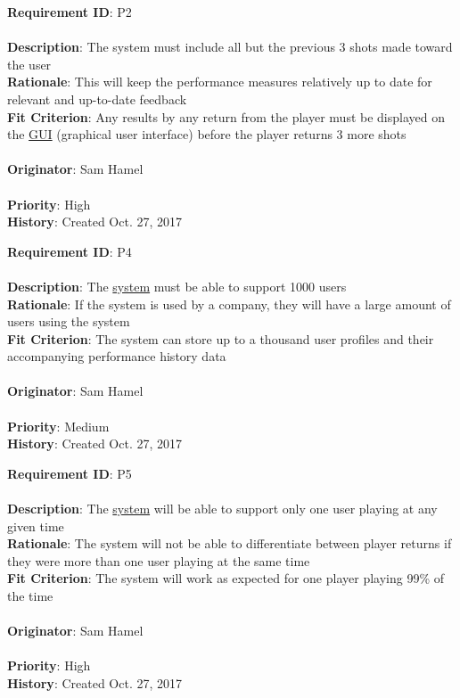 \documentclass[11pt]{article}
\begin{document}
\begin{framed}
	\noindent\textbf{Requirement ID}: P2 \hfill\\\\
	\noindent\textbf{Description}: The system must include all but the previous 3 shots made toward the user  \\
	\textbf{Rationale}: This will keep the performance measures relatively up to date for relevant and up-to-date feedback \\
	\textbf{Fit Criterion}: Any results by any return from the player must be displayed on the \hyperref[sec:definitions]{GUI} (graphical user interface) before the player returns 3 more shots \\\\
	\textbf{Originator}: Sam Hamel \\\\
	\textbf{Priority}: High \hfill \\
	\noindent\textbf{History}: Created Oct. 27, 2017
\end{framed}

\begin{framed}
	\noindent\textbf{Requirement ID}: P4 \hfill\\\\
	\noindent\textbf{Description}: The \hyperref[sec:definitions]{system} must be able to support 1000 users \\
	\textbf{Rationale}: If the system is used by a company, they will have a large amount of users using the system\\
	\textbf{Fit Criterion}: The system can store up to a thousand user profiles and their accompanying performance history data \\\\
	\textbf{Originator}: Sam Hamel \\\\
	\textbf{Priority}: Medium \hfill \\
	\noindent\textbf{History}: Created Oct. 27, 2017
\end{framed}

\begin{framed}
	\noindent\textbf{Requirement ID}: P5 \\\\
	\noindent\textbf{Description}: The \hyperref[sec:definitions]{system} will be able to support only one user playing at any given time \\
	\textbf{Rationale}: The system will not be able to differentiate between player returns if they were more than one user playing at the same time \\
	\textbf{Fit Criterion}: The system will work as expected for one player playing 99\% of the time \\\\
	\textbf{Originator}: Sam Hamel \\\\
	\textbf{Priority}: High \hfill \\
	\noindent\textbf{History}: Created Oct. 27, 2017
\end{framed}
\end{document}
